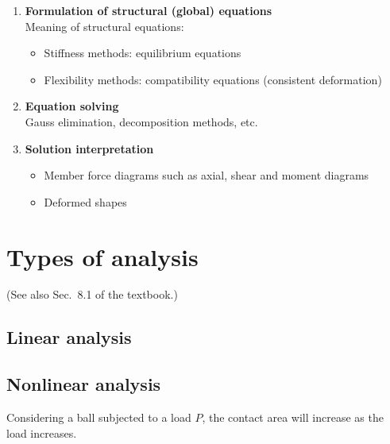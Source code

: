 \begin{enumerate}
\begin{itemize}
    \end{itemize}
  \item \textbf{Formulation of structural (global) equations}\\
    Meaning of structural equations:
    \begin{itemize}
      \item Stiffness methods: equilibrium equations
      \item Flexibility methods: compatibility equations (consistent deformation)
    \end{itemize}
  \item \textbf{Equation solving}\\
    Gauss elimination, decomposition methods, etc.
  \item \textbf{Solution interpretation}
    \begin{itemize}
      \item Member force diagrams such as axial, shear and moment diagrams
      \item Deformed shapes
    \end{itemize}
\end{enumerate}

\section{Types of analysis}
(See also Sec.~8.1 of the textbook.)

\subsection*{Linear analysis}

\subsection*{Nonlinear analysis}

\begin{fig}
  
\end{fig}

\begin{fig}
  
\end{fig}

\begin{fig}
  
\end{fig}
Considering a ball subjected to a load $P$, the contact area will increase as the load increases.

